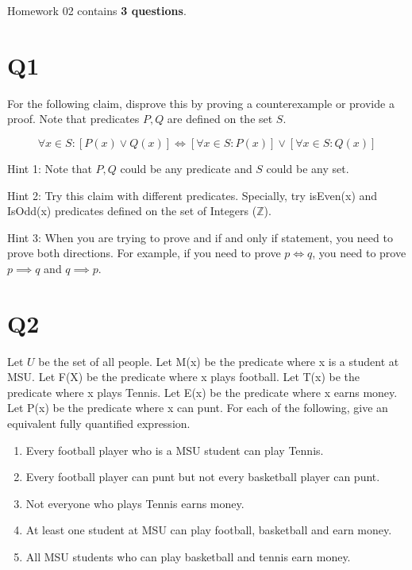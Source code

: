 \documentclass[12pt]{exam}
\begin{document}
Homework 02 contains \textbf{3 questions}.

\section{Q1}
For the following claim, disprove this by proving a counterexample or provide a proof. Note that predicates $P,Q$ are defined on the set $S$. 

\[\forall x \in S : [ P(x) \vee Q(x) ] \iff [\forall x \in S : P(x)] \vee [\forall x \in S : Q(x)]\]

Hint 1: Note that $P, Q$ could be any predicate and $S$ could be any set. 

Hint 2: Try this claim with different predicates. Specially, try isEven(x) and IsOdd(x) predicates defined on the set of Integers ($\mathds{Z}$).

Hint 3: When you are trying to prove and if and only if statement, you need to prove both directions. For example, if you need to prove $p \iff q$, you need to prove $p \implies q$ and $q \implies p$. 


\section{Q2} 
Let $U$ be the set of all people. Let M(x) be the predicate where x is a student at MSU. Let F(X) be the predicate where x plays football. Let T(x) be the predicate where x plays Tennis. Let E(x) be the predicate where x earns money. Let P(x) be the predicate where x can punt. For each of the following, give an equivalent fully quantified expression. 

\begin{enumerate}
    \item Every football player who is a MSU student can play Tennis. 
    \item Every football player can punt but not every basketball player can punt. 
    \item Not everyone who plays Tennis earns money.
    \item At least one student at MSU can play football, basketball and earn money.
    \item All MSU students who can play basketball and tennis earn money.
\end{enumerate}
\end{document}
